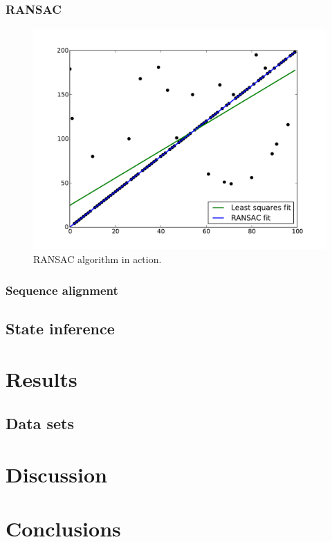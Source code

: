 \documentclass[a4paper]{report}
\begin{document}
\subsection{RANSAC}

\begin{figure}
    \includegraphics[width=\linewidth]{ransac}
    \caption{RANSAC algorithm in action.}
\end{figure}

\subsection{Sequence alignment}

\section{State inference}

\chapter{Results}

\section{Data sets}

\chapter{Discussion}

\chapter{Conclusions}
\end{document}
